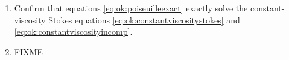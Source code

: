 \begin{enumerate}
\item \label{exer:ok:poiseuilleverify}  Confirm that equations \eqref{eq:ok:poiseuilleexact} exactly solve the constant-viscosity Stokes equations \eqref{eq:ok:constantviscositystokes} and \eqref{eq:ok:constantviscosityincomp}.

\item \label{exer:ok:smalldetails}  FIXME

\end{enumerate}
